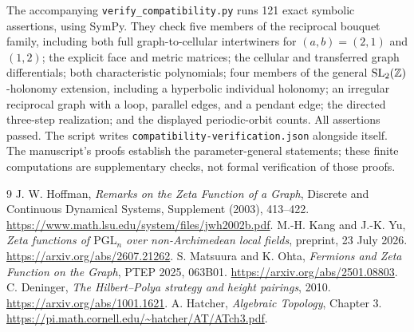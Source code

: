 \documentclass[11pt,a4paper]{article}
\theoremstyle{remark}\newtheorem{remark}[definition]{Remark}
\begin{document}
The accompanying \texttt{verify\_compatibility.py} runs 121 exact symbolic assertions, using SymPy. They check five members of the reciprocal bouquet family, including both full graph-to-cellular intertwiners for $(a,b)=(2,1)$ and $(1,2)$; the explicit face and metric matrices; the cellular and transferred graph differentials; both characteristic polynomials; four members of the general $\mathrm{SL}_2(\mathbb Z)$-holonomy extension, including a hyperbolic individual holonomy; an irregular reciprocal graph with a loop, parallel edges, and a pendant edge; the directed three-step realization; and the displayed periodic-orbit counts. All assertions passed. The script writes \texttt{compatibility-verification.json} alongside itself. The manuscript's proofs establish the parameter-general statements; these finite computations are supplementary checks, not formal verification of those proofs.

\begin{thebibliography}{9}
 J. W. Hoffman, \emph{Remarks on the Zeta Function of a Graph}, Discrete and Continuous Dynamical Systems, Supplement (2003), 413--422. \url{https://www.math.lsu.edu/system/files/jwh2002b.pdf}.
 M.-H. Kang and J.-K. Yu, \emph{Zeta functions of $\mathrm{PGL}_n$ over non-Archimedean local fields}, preprint, 23 July 2026. \url{https://arxiv.org/abs/2607.21262}.
 S. Matsuura and K. Ohta, \emph{Fermions and Zeta Function on the Graph}, PTEP 2025, 063B01. \url{https://arxiv.org/abs/2501.08803}.
 C. Deninger, \emph{The Hilbert--Polya strategy and height pairings}, 2010. \url{https://arxiv.org/abs/1001.1621}.
 A. Hatcher, \emph{Algebraic Topology}, Chapter 3. \url{https://pi.math.cornell.edu/~hatcher/AT/ATch3.pdf}.
\end{thebibliography}
\end{document}
